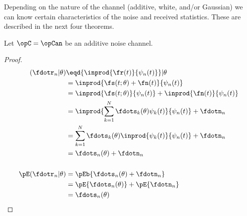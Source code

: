 Depending on the nature of the channel (additive, white, and/or Gaussian)
we can know certain characteristics of the noise and received statistics.
These are described in the next four theorems.


\begin{theorem}%
\label{thm:an_stats}
Let $\opC=\opCan$ be an additive noise channel.
\end{theorem}
\begin{proof}
\begin{align*}
   (\fdotr_n |\theta)
     &\eqd {\inprod{\fr(t)}{\psi_n(t)}}  |\theta
   \\&=    {\inprod{\fs(t;\theta)+\fn(t)}{\psi_n(t)}}
   \\&=    {\inprod{\fs(t;\theta)}{\psi_n(t)}} +   {\inprod{\fn(t)}{\psi_n(t)}}
   \\&=    \inprod{\sum_{k=1}^N \fdots_k(\theta) \psi_k(t)}{\psi_n(t)} + \fdotn_n
   \\&=    \sum_{k=1}^N \fdots_k(\theta) \inprod{\psi_k(t)}{\psi_n(t)} + \fdotn_n
   \\&=    \fdots_n(\theta)  + \fdotn_n
\\ \\
   \pE({\fdotr_n} | \theta)
     &= \pEb{\fdots_n(\theta)  + \fdotn_n}
   \\&= \pE{\fdots_n(\theta) } +   \pE{\fdotn_n}
   \\&= \fdots_n(\theta)
\end{align*}
\end{proof}


